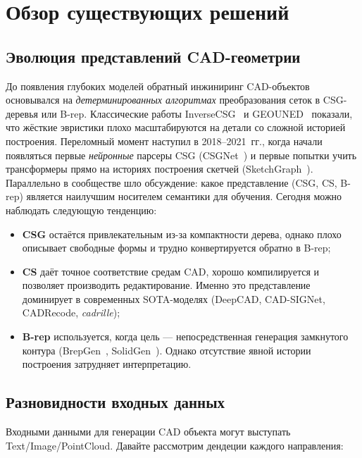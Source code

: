 \section{Обзор существующих решений}
\label{sec:Chapter2} 

\subsection{Эволюция представлений CAD-геометрии}

До появления глубоких моделей обратный инжиниринг CAD-объектов
основывался на \textit{детерминированных алгоритмах} преобразования
сеток в CSG-деревья или B-rep. Классические работы
InverseCSG~\cite{inala18_inversecsg} и GEOUNED~\cite{catalan24_geouned}
показали, что жёсткие эвристики плохо масштабируются на детали со
сложной историей построения. Переломный момент наступил в
2018--2021~гг., когда начали появляться первые \textit{нейронные}
парсеры CSG (CSGNet~\cite{sharma18_csgnet}) и первые попытки учить
трансформеры прямо на историях построения скетчей
(SketchGraph~\cite{ganin21_cadlanguage}). Параллельно в сообществе
шло обсуждение: какое представление (CSG, CS, B-rep)
является наилучшим носителем семантики для обучения. Сегодня можно
наблюдать следующую тенденцию:

\begin{itemize}
	\item \textbf{CSG} остаётся привлекательным из-за компактности
	      дерева, однако плохо описывает свободные формы и трудно
	      конвертируется обратно в B-rep;
	\item \textbf{CS} даёт точное соответствие
	      средам CAD, хорошо компилируется и позволяет производить
	      редактирование. Именно это представление доминирует
	      в современных SOTA-моделях (DeepCAD, CAD-SIGNet, CADRecode,
	      \textit{cadrille});
	\item \textbf{B-rep} используется, когда цель — непосредственная
	      генерация замкнутого контура
	      (BrepGen~\cite{xu24_brepgen}, SolidGen~\cite{jayaraman22_solidgen}).
	      Однако отсутствие явной истории построения затрудняет
	      интерпретацию.
\end{itemize}

\subsection{Разновидности входных данных}

Входными данными для генерации CAD объекта могут выступать Text/Image/PointCloud. Давайте рассмотрим дендеции каждого направления:

